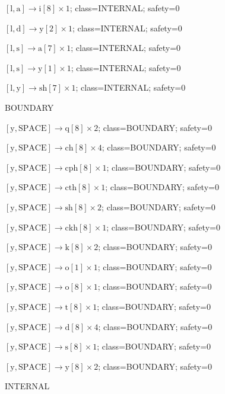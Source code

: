 \(\left[\mathrm{l}, \mathrm{a}\right] \to \mathrm{i}[8] \times 1\); class=INTERNAL; safety=0\par
\(\left[\mathrm{l}, \mathrm{d}\right] \to \mathrm{y}[2] \times 1\); class=INTERNAL; safety=0\par
\(\left[\mathrm{l}, \mathrm{s}\right] \to \mathrm{a}[7] \times 1\); class=INTERNAL; safety=0\par
\(\left[\mathrm{l}, \mathrm{s}\right] \to \mathrm{y}[1] \times 1\); class=INTERNAL; safety=0\par
\(\left[\mathrm{l}, \mathrm{y}\right] \to \mathrm{sh}[7] \times 1\); class=INTERNAL; safety=0\par
BOUNDARY\par
\(\left[\mathrm{y}, \mathrm{SPACE}\right] \to \mathrm{q}[8] \times 2\); class=BOUNDARY; safety=0\par
\(\left[\mathrm{y}, \mathrm{SPACE}\right] \to \mathrm{ch}[8] \times 4\); class=BOUNDARY; safety=0\par
\(\left[\mathrm{y}, \mathrm{SPACE}\right] \to \mathrm{cph}[8] \times 1\); class=BOUNDARY; safety=0\par
\(\left[\mathrm{y}, \mathrm{SPACE}\right] \to \mathrm{cth}[8] \times 1\); class=BOUNDARY; safety=0\par
\(\left[\mathrm{y}, \mathrm{SPACE}\right] \to \mathrm{sh}[8] \times 2\); class=BOUNDARY; safety=0\par
\(\left[\mathrm{y}, \mathrm{SPACE}\right] \to \mathrm{ckh}[8] \times 1\); class=BOUNDARY; safety=0\par
\(\left[\mathrm{y}, \mathrm{SPACE}\right] \to \mathrm{k}[8] \times 2\); class=BOUNDARY; safety=0\par
\(\left[\mathrm{y}, \mathrm{SPACE}\right] \to \mathrm{o}[1] \times 1\); class=BOUNDARY; safety=0\par
\(\left[\mathrm{y}, \mathrm{SPACE}\right] \to \mathrm{o}[8] \times 1\); class=BOUNDARY; safety=0\par
\(\left[\mathrm{y}, \mathrm{SPACE}\right] \to \mathrm{t}[8] \times 1\); class=BOUNDARY; safety=0\par
\(\left[\mathrm{y}, \mathrm{SPACE}\right] \to \mathrm{d}[8] \times 4\); class=BOUNDARY; safety=0\par
\(\left[\mathrm{y}, \mathrm{SPACE}\right] \to \mathrm{s}[8] \times 1\); class=BOUNDARY; safety=0\par
\(\left[\mathrm{y}, \mathrm{SPACE}\right] \to \mathrm{y}[8] \times 2\); class=BOUNDARY; safety=0\par
INTERNAL\par

